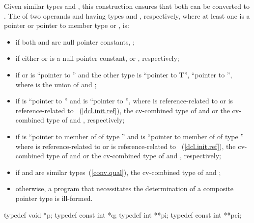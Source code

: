 \enternote Given similar types  and , this
construction ensures that
both can be converted to . \exitnote
The  of
two operands  and
 having types  and , respectively, where at least one is a
pointer or pointer to member type or
, is:

\begin{itemize}
\item
if both  and  are null pointer constants,
;

\item
if either  or  is a null pointer constant,  or ,
respectively;

\item
if  or  is ``pointer to  '' and the
other type is ``pointer to  T'', ``pointer to 
'', where  is the union of 
and ;

\item
if  is ``pointer to  '' and  is ``pointer to
 '', where  is reference-related to  or  is
reference-related to ~(\ref{dcl.init.ref}), the cv-combined type
of  and  or the cv-combined type of  and ,
respectively;

\item
if  is ``pointer to member of  of type  '' and  is
``pointer to member of  of type  '' where  is
reference-related to  or  is reference-related to
~(\ref{dcl.init.ref}), the cv-combined type of  and  or the cv-combined type
of  and , respectively;

\item
if  and  are similar types~(\ref{conv.qual}), the cv-combined type of  and
;

\item
otherwise, a program that necessitates the determination of a
composite pointer type is ill-formed.
\end{itemize}

\enterexample
\begin{codeblock}
typedef void *p;
typedef const int *q;
typedef int **pi;
typedef const int **pci;
\end{codeblock}

